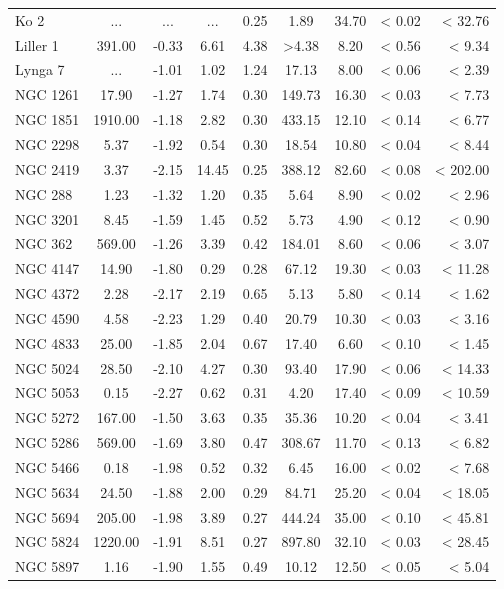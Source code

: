 \documentclass[doublespace,nopageskip]{VTthesis} %
\begin{document}
\begin{appendices}
\begin{table}
\begin{tabular}{lcccccccr}
Ko 2 & ... & ... & ... & 0.25 & 1.89 & 34.70 & < 0.02 & < 32.76\\
Liller 1 & 391.00 & -0.33 & 6.61 & 4.38 & >4.38 & 8.20 & < 0.56 & < 9.34\\
Lynga 7 & ... & -1.01 & 1.02 & 1.24 & 17.13 & 8.00 & < 0.06 & < 2.39\\
NGC 1261 & 17.90 & -1.27 & 1.74 & 0.30 & 149.73 & 16.30 & < 0.03 & < 7.73\\
NGC 1851 & 1910.00 & -1.18 & 2.82 & 0.30 & 433.15 & 12.10 & < 0.14 & < 6.77\\
NGC 2298 & 5.37 & -1.92 & 0.54 & 0.30 & 18.54 & 10.80 & < 0.04 & < 8.44\\
NGC 2419 & 3.37 & -2.15 & 14.45 & 0.25 & 388.12 & 82.60 & < 0.08 & < 202.00\\
NGC 288 & 1.23 & -1.32 & 1.20 & 0.35 & 5.64 & 8.90 & < 0.02 & < 2.96\\
NGC 3201 & 8.45 & -1.59 & 1.45 & 0.52 & 5.73 & 4.90 & < 0.12 & < 0.90\\
NGC 362 & 569.00 & -1.26 & 3.39 & 0.42 & 184.01 & 8.60 & < 0.06 & < 3.07\\
NGC 4147 & 14.90 & -1.80 & 0.29 & 0.28 & 67.12 & 19.30 & < 0.03 & < 11.28\\
NGC 4372 & 2.28 & -2.17 & 2.19 & 0.65 & 5.13 & 5.80 & < 0.14 & < 1.62\\
NGC 4590 & 4.58 & -2.23 & 1.29 & 0.40 & 20.79 & 10.30 & < 0.03 & < 3.16\\
NGC 4833 & 25.00 & -1.85 & 2.04 & 0.67 & 17.40 & 6.60 & < 0.10 & < 1.45\\
NGC 5024 & 28.50 & -2.10 & 4.27 & 0.30 & 93.40 & 17.90 & < 0.06 & < 14.33\\
NGC 5053 & 0.15 & -2.27 & 0.62 & 0.31 & 4.20 & 17.40 & < 0.09 & < 10.59\\
NGC 5272 & 167.00 & -1.50 & 3.63 & 0.35 & 35.36 & 10.20 & < 0.04 & < 3.41\\
NGC 5286 & 569.00 & -1.69 & 3.80 & 0.47 & 308.67 & 11.70 & < 0.13 & < 6.82\\
NGC 5466 & 0.18 & -1.98 & 0.52 & 0.32 & 6.45 & 16.00 & < 0.02 & < 7.68\\
NGC 5634 & 24.50 & -1.88 & 2.00 & 0.29 & 84.71 & 25.20 & < 0.04 & < 18.05\\
NGC 5694 & 205.00 & -1.98 & 3.89 & 0.27 & 444.24 & 35.00 & < 0.10 & < 45.81\\
NGC 5824 & 1220.00 & -1.91 & 8.51 & 0.27 & 897.80 & 32.10 & < 0.03 & < 28.45\\
NGC 5897 & 1.16 & -1.90 & 1.55 & 0.49 & 10.12 & 12.50 & < 0.05 & < 5.04\\

\end{tabular}
\end{table}
\end{appendices}
\end{document}
